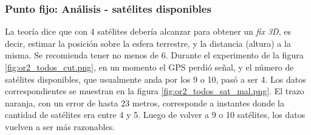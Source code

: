 \documentclass[main]{subfiles}
\begin{document}
\begin{figure}[h!]
  \hspace{-50pt}
\vspace{-20pt}
\end{figure}

\subsubsection{Punto fijo: Análisis - \textbf{satélites disponibles}}
\label{sec:gps2-punto-fijo-analisis-sat-count}

La teoría dice que con 4 satélites debería alcanzar para obtener un \textit{fix 3D}, es decir, estimar la posición sobre la esfera terrestre, y la distancia (altura) a la misma. Se recomienda tener no menos de 6. Durante el experimento de la figura \ref{fig:or2_todos_cut.png}, en un momento el GPS perdió señal, y el número de satélites disponibles, que usualmente anda por los 9 o 10, pasó a ser 4. Los datos correspondientes se muestran en la figura \ref{fig:or2_todos_sat_mal.png}. El trazo naranja, con un error de hasta 23 metros, corresponde a instantes donde la cantidad de satélites era entre 4 y 5. Luego de volver a 9 o 10 satélites, los datos vuelven a ser más razonables.
\end{document}
